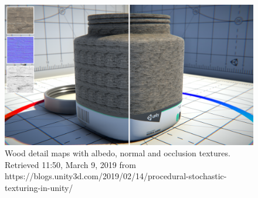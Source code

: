 \documentclass[10pt,a4paper]{article}
\begin{document}
\begin{figure}[H]
   \includegraphics[width=\textwidth, height=\textheight, keepaspectratio]{proceduralStochasticTexturingInUnityExample.png}
   \caption{Wood detail maps with albedo, normal and occlusion textures. Retrieved 11:50, March 9, 2019 from {https://blogs.unity3d.com/2019/02/14/procedural-stochastic-texturing-in-unity/}}
   \label{fig:procStocTexturing}
\end{figure}
\newpage
\end{document}
